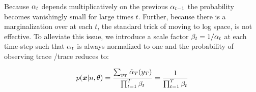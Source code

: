 Because $\alpha_{t}$ depends multiplicatively on the previous $\alpha_{t-1}$ the probability becomes vanishingly small for large times $t$. Further, because there is a marginalization over \states at each $t$, the standard trick of moving to log space, is not effective. To alleviate this issue, we introduce a scale factor $\beta_{t} = 1 / \alpha_{t}$ at each time-step such that $\alpha_{t}$ is always normalized to one and the probability of observing trace /trace reduces to:

\begin{equation}
	p(\bm{x} | n, \theta)
    = \frac
      {\sum_{y_{T}}\tilde{\alpha}_{T}(y_{T})}
      {\prod_{t=1}^{T}\beta_{t}}
    = \frac
      {1}
      {\prod_{t=1}^{T}\beta_{t}}
\end{equation}
